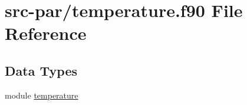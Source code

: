 \hypertarget{temperature_8f90}{\section{src-\/par/temperature.f90 File Reference}
\label{temperature_8f90}
}
\subsection*{Data Types}
\begin{DoxyCompactItemize}
\item 
module \hyperlink{classtemperature}{temperature}
\end{DoxyCompactItemize}
